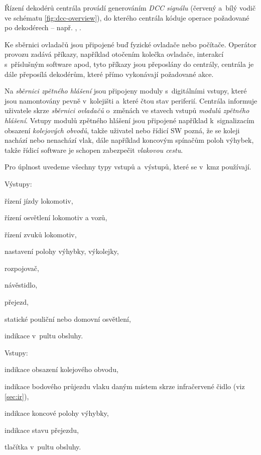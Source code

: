 Řízení dekodérů centrála provádí generováním \textit{DCC signálu} (červený
a~bílý vodič ve schématu \ref{fig:dcc-overview}), do kterého centrála kóduje
operace požadované po dekodérech – např. , .

Ke sběrnici ovladačů jsou připojené buď fyzické ovladače nebo počítače.
Operátor provozu zadává příkazy, například otočením kolečka ovladače, interakcí
s~příslušným software apod, tyto příkazy jsou přeposlány do centrály, centrála
je dále přeposílá dekodérům, které přímo vykonávají požadované akce.

Na \textit{sběrnici zpětného hlášení} jsou připojeny moduly s~digitálními vstupy,
které jsou namontovány pevně v~kolejišti a~které čtou stav periferií.
Centrála informuje uživatele skrze \textit{sběrnici ovladačů} o~změnách ve
stavech vstupů \textit{modulů zpětného hlášení}. Vstupy modulů zpětného hlášení
jsou připojené například k~signalizacím obsazení \textit{kolejových obvodů},
takže uživatel nebo řídicí SW pozná, že se koleji nachází nebo nenachází vlak,
dále například koncovým spínačům poloh výhybek, takže řídicí software je
schopen zabezpečit \textit{vlakovou cestu}.

Pro úplnost uvedeme všechny typy vstupů a~výstupů, které se v~\gls{kmz}
používají.

Výstupy:

\begin{compactitem}
\item řízení jízdy lokomotiv,
\item řízení osvětlení lokomotiv a vozů,
\item řízení zvuků lokomotiv,
\item nastavení polohy výhybky, výkolejky,
\item rozpojovač,
\item návěstidlo,
\item přejezd,
\item statické pouliční nebo domovní osvětlení,
\item indikace v~pultu obsluhy.
\end{compactitem}

Vstupy:

\begin{compactitem}
\item indikace obsazení kolejového obvodu,
\item indikace bodového průjezdu vlaku daným místem skrze infračervené čidlo
	(viz \ref{sec:ir}),
\item indikace koncové polohy výhybky,
\item indikace stavu přejezdu,
\item tlačítka v~pultu obsluhy.
\end{compactitem}


